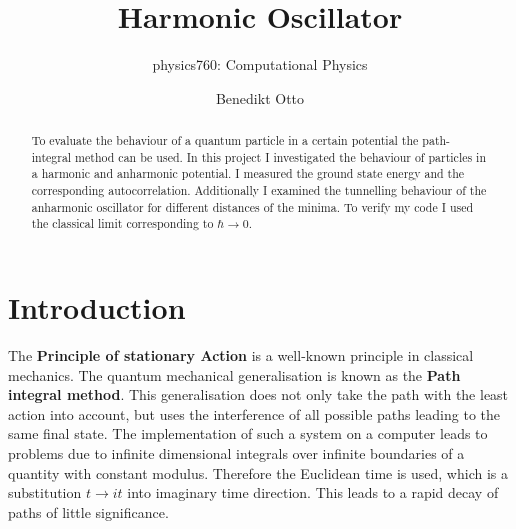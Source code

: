 \documentclass{scrartcl}
\title{Harmonic Oscillator}
\author{Benedikt Otto}
\subtitle{physics760: Computational Physics}
\begin{document}
	\maketitle
	\newpage
	\tableofcontents
	\newpage
	\begin{abstract}
		To evaluate the behaviour of a quantum particle in a certain potential the path-integral method can be used.
		In this project I investigated the behaviour of particles in a harmonic and anharmonic potential.
		I measured the ground state energy and the corresponding autocorrelation.
		Additionally I examined the tunnelling behaviour of the anharmonic oscillator for different distances of the minima.
		To verify my code I used the classical limit corresponding to $\hbar \rightarrow 0$.
	\end{abstract}
	\section{Introduction}
		The \textbf{Principle of stationary Action} is a well-known principle in classical mechanics.
		The quantum mechanical generalisation is known as the \textbf{Path integral method}.
		This generalisation does not only take the path with the least action into account, but uses the interference of all possible paths leading to the same final state.
		The implementation of such a system on a computer leads to problems due to infinite dimensional integrals over infinite boundaries of a quantity with constant modulus.
		Therefore the Euclidean time is used, which is a substitution $t \rightarrow i t$ into imaginary time direction.
		This leads to a rapid decay of paths of little significance.
\end{document}
